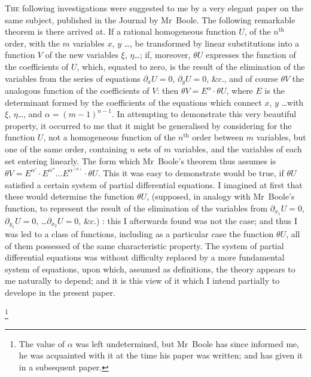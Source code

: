 \documentclass[11pt,a4paper]{article}
\theoremstyle{plain}
\theoremstyle{definition}
\theoremstyle{remark}
\begin{document}
\textsc{The} following investigations were suggested to me by a very elegant paper on
the same subject, published in the Journal by Mr~Boole. The following remarkable
theorem is there arrived at. If a rational homogeneous function $U$, of the $n^{\text{th}}$ order,
with the $m$ variables $x$, $y$ \ldots, be transformed by linear substitutions into a function
$V$ of the new variables $\xi$, $\eta$\ldots; if, moreover, $\theta U$ expresses the function of the
coefficients of $U$, which, equated to zero, is the result of the elimination of the
variables from the series of equations $\partial_x U=0$, $\partial_y U=0$, \&c., and of course $\theta V$ the
analogous function of the coefficients of $V$: then $\theta V = E^{\alpha} \cdot \theta U$, where $E$ is the
determinant formed by the coefficients of the equations which connect $x$, $y$ \ldots with
$\xi$, $\eta$\ldots, and $\alpha = (m-1)^{n-1}$. In attempting to demonstrate this very beautiful property,
it occurred to me that it might be generalised by considering for the function $U$, not
a homogeneous function of the $n^{\text{th}}$ order between $m$ variables, but one of the same
order, containing $n$ sets of $m$ variables, and the variables of each set entering
linearly. The form which Mr~Boole's theorem thus assumes is $\theta V = E^{\alpha'} \cdot E^{\alpha''} \ldots E^{\alpha^{(n)}} \cdot \theta U$.
This it was easy to demonstrate would be true, if $\theta U$ satisfied a certain system of
partial differential equations. I imagined at first that these would determine the
function $\theta U$, (supposed, in analogy with Mr~Boole's function, to represent the result of
the elimination of the variables from $\partial_{x_1}U=0$, $\partial_{y_1}U=0$, \ldots $\partial_{x_2}U=0$, \&c.) : this I afterwards
found was not the case; and thus I was led to a class of functions, including as
a particular case the function $\theta U$, all of them possessed of the same characteristic
property. The system of partial differential equations was without difficulty replaced
by a more fundamental system of equations, upon which, assumed as definitions, the
theory appears to me naturally to depend; and it is this view of it which I intend
partially to develope in the present paper.

\footnote{The value of $\alpha$ was left undetermined, but Mr~Boole has since informed me, he was acquainted with
it at the time his paper was written; and has given it in a subsequent paper.}
\end{document}
